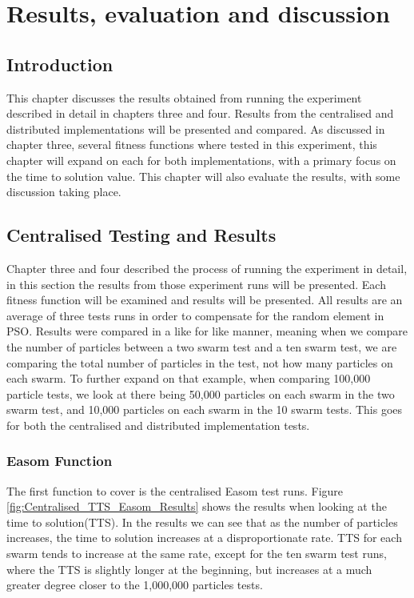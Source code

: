 \documentclass[oneside,12pt]{book}
\begin{document}
\chapter{Results, evaluation and discussion}
\section{Introduction}
This chapter discusses the results obtained from running the experiment described in detail in chapters three and four. Results from the centralised and distributed implementations will be presented and compared. As discussed in chapter three, several fitness functions where tested in this experiment, this chapter will expand on each for both implementations, with a primary focus on the time to solution value. This chapter will also evaluate the results, with some discussion taking place. 

\section{Centralised Testing and Results}
Chapter three and four described the process of running the experiment in detail, in this section the results from those experiment runs will be presented. Each fitness function will be examined and results will be presented. All results are an average of three tests runs in order to compensate for the random element in PSO. Results were compared in a like for like manner, meaning when we compare the number of particles between a two swarm test and a ten swarm test, we are comparing the total number of particles in the test, not how many particles on each swarm. To further expand on that example, when comparing 100,000 particle tests, we look at there being 50,000 particles on each swarm in the two swarm test, and 10,000 particles on each swarm in the 10 swarm tests. This goes for both the centralised and distributed implementation tests. 

\subsection{Easom Function}
The first function to cover is the centralised Easom test runs. Figure \ref{fig:Centralised_TTS_Easom_Results} shows the results when looking at the time to solution(TTS). In the results we can see that as the number of particles increases, the time to solution increases at a disproportionate rate. TTS for each swarm tends to increase at the same rate, except for the ten swarm test runs, where the TTS is slightly longer at the beginning, but increases at a much greater degree closer to the 1,000,000 particles tests.
\end{document}
